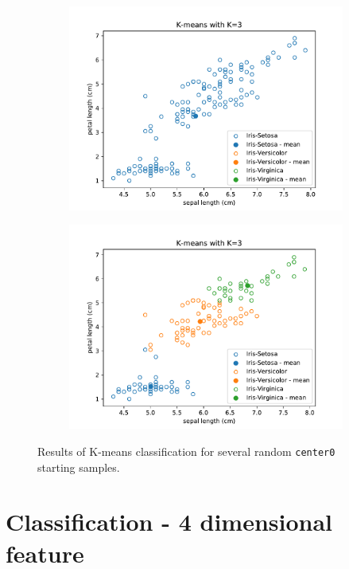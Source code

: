 \documentclass{article}
\begin{document}
\begin{figure}[!ht]
{\begin{subfigure}{0.6\textwidth}
	\includegraphics[width=\textwidth]{./Figures/2_1_Kmeans_randinit2}
	\end{subfigure}
	\begin{subfigure}{0.6\textwidth}
	\includegraphics[width=\textwidth]{./Figures/2_1_Kmeans_randinit3}
	\end{subfigure}
	}	
	\caption{Results of K-means classification for several random \texttt{center0} starting samples.}
	\label{2_1_Kmeans_randinit}
\end{figure}

\clearpage

\section{Classification - 4 dimensional feature}
\end{document}
